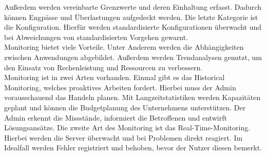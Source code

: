 {    Außerdem werden vereinbarte Grenzwerte und deren Einhaltung erfasst.
    Dadurch können Engpässe und Überlastungen aufgedeckt werden.
    Die letzte Kategorie ist die Konfiguration.
    Hierfür werden standardisierte Konfigurationen überwacht und bei Abweichungen von standardisierten Vorgehen gewarnt.
    \\
    Monitoring bietet viele Vorteile.
    Unter Anderem werden die Abhängigkeiten zwischen Anwendungen abgebildet.
    Außerdem werden Trendanalysen genutzt, um den Einsatz von Rechenleistung und Ressourcen zu verbessern.
    \\
    Monitoring ist in zwei Arten vorhanden.
    Einmal gibt es das Historical Monitoring, welches proaktives Arbeiten fordert.
    Hierbei muss der Admin vorausschauend das Handeln planen.
    Mit Langzeitstatistiken werden Kapazitäten geplant und können die Budgetplanung des Unternehmens unterstützen.
    Der Admin erkennt die Missstände, informiert die Betroffenen und entwirft Lösungsansätze.
    Die zweite Art des Monitoring ist das Real-Time-Monitoring.
    Hierbei werden die Server überwacht und bei Problemen direkt reagiert.
    Im Idealfall werden Fehler registriert und behoben, bevor der Nutzer diesen bemerkt.
}\autocite{cloudradar, wbs, crossmedia}

